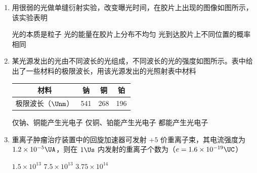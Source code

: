 \documentclass[\gkver]{gaokaozhenti}
\begin{document}
\begin{enumerate}
\item
用很弱的光做单缝衍射实验，改变曝光时间，在胶片上出现的图像如图所示，该实验表明

\onepicture[h=2.20cm]{}

{光的本质是粒子}
{光的能量在胶片上分布不均匀}
{光到达胶片上不同位置的概率相同}


\item
某光源发出的光由不同波长的光组成，不同波长的光的强度如图所示。表中给出了一些材料的极限波长，用该光源发出的光照射表中材料

\onepicture[w=5.90cm]{}

\begin{center}
\begin{tabular}{|c|c|c|c|}
\hline
材料 & 钠 & 铜 & 铂 \\
\hline
极限波长（$\Unm$） & 541 & 268 & 196 \\
\hline
\end{tabular}
\end{center}

{仅钠、铜能产生光电子}
{仅铜、铂能产生光电子}
{都能产生光电子}


\item
重离子肿瘤治疗装置中的回旋加速器可发射 $+5$ 价重离子束，其电流强度为 $1.2\times10^{-5}\UA$，则在 $1\Us$ 内发射的重离子个数为（$e=1.6\times10^{-19}\UC$）

{$1.5\times10^{13}$}
{$7.5\times10^{13}$}
{$3.75\times10^{14}$}


\end{enumerate}
\end{document}

